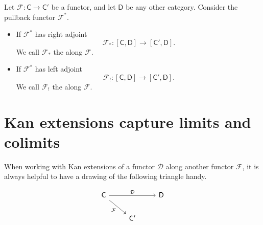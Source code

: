 \documentclass[notes.tex]{subfiles}
\begin{document}
\begin{definition}
  \label{def:kan_extension}
  Let $\mathcal{F}\colon \mathsf{C} \to \mathsf{C}'$ be a functor, and let $\mathsf{D}$ be any other category. Consider the pullback functor $\mathcal{F}^{*}$.

  \begin{itemize}
    \item If $\mathcal{F}^{*}$ has right adjoint
      \begin{equation*}
        \mathcal{F}_{*}\colon [\mathsf{C}, \mathsf{D}] \to [\mathsf{C}', \mathsf{D}].
      \end{equation*}
      We call $\mathcal{F}_{*}$ the  along $\mathcal{F}$.

    \item If $\mathcal{F}^{*}$ has left adjoint
      \begin{equation*}
        \mathcal{F}_{!}\colon [\mathsf{C}, \mathsf{D}] \to [\mathsf{C}', \mathsf{D}].
      \end{equation*}
      We call $\mathcal{F}_{!}$ the  along $\mathcal{F}$.
  \end{itemize}
\end{definition}

\section{Kan extensions capture limits and colimits}
\label{sec:kan_extensions_capture_limits_and_colimits}

When working with Kan extensions of a functor $\mathcal{D}$ along another functor $\mathcal{F}$, it is always helpful to have a drawing of the following triangle handy.

\begin{equation*}
  \begin{tikzcd}
    \mathsf{C}
    \arrow[rr, "\mathcal{D}"]
    \arrow[dr, swap, "\mathcal{F}"]
    && \mathsf{D}
    \\
    &\mathsf{C}'
  \end{tikzcd}
\end{equation*}
\end{document}
